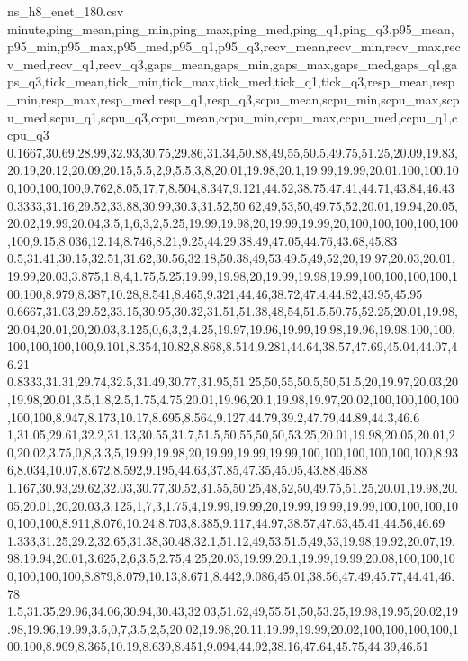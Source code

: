 \begin{filecontents*}[overwrite]{ns_h8_enet_180.csv}
minute,ping_mean,ping_min,ping_max,ping_med,ping_q1,ping_q3,p95_mean,p95_min,p95_max,p95_med,p95_q1,p95_q3,recv_mean,recv_min,recv_max,recv_med,recv_q1,recv_q3,gaps_mean,gaps_min,gaps_max,gaps_med,gaps_q1,gaps_q3,tick_mean,tick_min,tick_max,tick_med,tick_q1,tick_q3,resp_mean,resp_min,resp_max,resp_med,resp_q1,resp_q3,scpu_mean,scpu_min,scpu_max,scpu_med,scpu_q1,scpu_q3,ccpu_mean,ccpu_min,ccpu_max,ccpu_med,ccpu_q1,ccpu_q3
0.1667,30.69,28.99,32.93,30.75,29.86,31.34,50.88,49,55,50.5,49.75,51.25,20.09,19.83,20.19,20.12,20.09,20.15,5.5,2,9,5.5,3,8,20.01,19.98,20.1,19.99,19.99,20.01,100,100,100,100,100,100,9.762,8.05,17.7,8.504,8.347,9.121,44.52,38.75,47.41,44.71,43.84,46.43
0.3333,31.16,29.52,33.88,30.99,30.3,31.52,50.62,49,53,50,49.75,52,20.01,19.94,20.05,20.02,19.99,20.04,3.5,1,6,3,2,5.25,19.99,19.98,20,19.99,19.99,20,100,100,100,100,100,100,9.15,8.036,12.14,8.746,8.21,9.25,44.29,38.49,47.05,44.76,43.68,45.83
0.5,31.41,30.15,32.51,31.62,30.56,32.18,50.38,49,53,49.5,49,52,20,19.97,20.03,20.01,19.99,20.03,3.875,1,8,4,1.75,5.25,19.99,19.98,20,19.99,19.98,19.99,100,100,100,100,100,100,8.979,8.387,10.28,8.541,8.465,9.321,44.46,38.72,47.4,44.82,43.95,45.95
0.6667,31.03,29.52,33.15,30.95,30.32,31.51,51.38,48,54,51.5,50.75,52.25,20.01,19.98,20.04,20.01,20,20.03,3.125,0,6,3,2,4.25,19.97,19.96,19.99,19.98,19.96,19.98,100,100,100,100,100,100,9.101,8.354,10.82,8.868,8.514,9.281,44.64,38.57,47.69,45.04,44.07,46.21
0.8333,31.31,29.74,32.5,31.49,30.77,31.95,51.25,50,55,50.5,50,51.5,20,19.97,20.03,20,19.98,20.01,3.5,1,8,2.5,1.75,4.75,20.01,19.96,20.1,19.98,19.97,20.02,100,100,100,100,100,100,8.947,8.173,10.17,8.695,8.564,9.127,44.79,39.2,47.79,44.89,44.3,46.6
1,31.05,29.61,32.2,31.13,30.55,31.7,51.5,50,55,50,50,53.25,20.01,19.98,20.05,20.01,20,20.02,3.75,0,8,3,3,5,19.99,19.98,20,19.99,19.99,19.99,100,100,100,100,100,100,8.936,8.034,10.07,8.672,8.592,9.195,44.63,37.85,47.35,45.05,43.88,46.88
1.167,30.93,29.62,32.03,30.77,30.52,31.55,50.25,48,52,50,49.75,51.25,20.01,19.98,20.05,20.01,20,20.03,3.125,1,7,3,1.75,4,19.99,19.99,20,19.99,19.99,19.99,100,100,100,100,100,100,8.911,8.076,10.24,8.703,8.385,9.117,44.97,38.57,47.63,45.41,44.56,46.69
1.333,31.25,29.2,32.65,31.38,30.48,32.1,51.12,49,53,51.5,49,53,19.98,19.92,20.07,19.98,19.94,20.01,3.625,2,6,3.5,2.75,4.25,20.03,19.99,20.1,19.99,19.99,20.08,100,100,100,100,100,100,8.879,8.079,10.13,8.671,8.442,9.086,45.01,38.56,47.49,45.77,44.41,46.78
1.5,31.35,29.96,34.06,30.94,30.43,32.03,51.62,49,55,51,50,53.25,19.98,19.95,20.02,19.98,19.96,19.99,3.5,0,7,3.5,2,5,20.02,19.98,20.11,19.99,19.99,20.02,100,100,100,100,100,100,8.909,8.365,10.19,8.639,8.451,9.094,44.92,38.16,47.64,45.75,44.39,46.51

\end{filecontents*}
